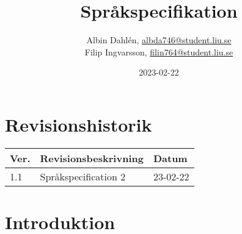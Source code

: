\documentclass{TDP003mall}
\author{Albin Dahlén, \url{albda746@student.liu.se}\\
Filip Ingvarsson, \url{filin764@student.liu.se}}
\title{Språkspecifikation}
\date{2023-02-22}
\begin{document}
    \projectpage

    \tableofcontents

    \section*{Revisionshistorik}
    \begin{table}[!h]
        \begin{tabularx}{\linewidth}{|l|X|l|}
            \hline
            Ver. & Revisionsbeskrivning      & Datum    \\\hline
            1.1  & Språkspecification 2     & 23-02-22 \\\hline
        \end{tabularx}
    \end{table}

    \newpage


    \section{Introduktion}
\end{document}
